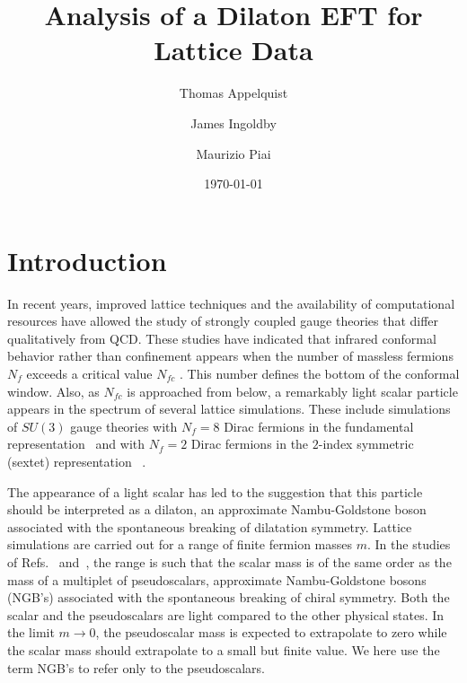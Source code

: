 \documentclass[a4paper,11pt]{article}
\title{Analysis of a Dilaton EFT for Lattice Data}
\author[a]{Thomas Appelquist}
\affiliation[a]{Department of Physics, Sloane Laboratory, Yale University,\\Prospect Street, New Haven,Connecticut 06520, USA}
\author[a]{James Ingoldby}
\author[b]{Maurizio Piai}
\affiliation[b]{Department of Physics, College of Science, Swansea University,\\Singleton Park, Swansea, Wales, UK}
\date{\today}
\begin{document}
\maketitle
\flushbottom



\section{Introduction}
\label{Sec:Introduction}

In recent years, improved lattice techniques and the availability of computational resources have allowed the study of strongly coupled gauge theories
that differ qualitatively from QCD. These studies have indicated that infrared conformal behavior rather than confinement appears when the number of massless fermions $N_f$ exceeds a critical value $N_{fc}$ \cite{DeGrand:2015zxa}. This number defines the bottom of the conformal window. Also, as $N_{fc}$ is approached from below, a remarkably light scalar particle appears in the spectrum of several lattice simulations. These include simulations of $SU(3)$ gauge theories with $N_f = 8$ Dirac fermions in the fundamental representation~\cite{LSD,LatKMI,LatKMI2} and with $N_f = 2$ Dirac fermions in the $2$-index symmetric (sextet) representation ~\cite{FHKNSW,FHKMNW,FHKMNW2}.

The appearance of a light scalar has led to the suggestion that this particle should be interpreted as a dilaton, an approximate Nambu-Goldstone boson associated with the spontaneous breaking of dilatation symmetry. Lattice simulations are carried out for a range of finite fermion masses $m$. In the studies of Refs.~\cite{LSD,LatKMI,LatKMI2} and~\cite{FHKNSW,FHKMNW,FHKMNW2}, the range is such that the scalar mass is of the same order as the mass of a multiplet of pseudoscalars, approximate Nambu-Goldstone bosons (NGB's) associated with the spontaneous breaking of chiral symmetry. Both the scalar and the pseudoscalars are light compared to the other physical states. In the limit $m \rightarrow 0$, the pseudoscalar mass is expected to extrapolate to zero while the scalar mass should extrapolate to a small but finite value. We here use the term NGB's to refer only to the pseudoscalars.
\end{document}
